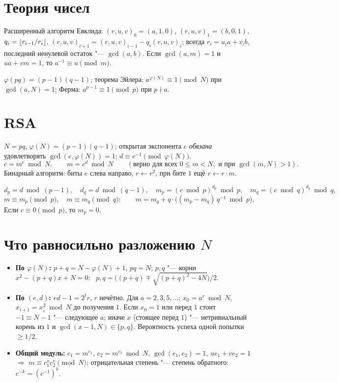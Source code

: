 \documentclass{ca-handout}
\begin{document}
\makehandouttitle

\section{Теория чисел}
Расширенный алгоритм Евклида: $(r, u, v)_0 = (a, 1, 0)$, $(r, u, v)_1 = (b, 0, 1)$,
$q_i = \lfloor r_{i-1}/r_i\rfloor$, $(r, u, v)_{i+1} = (r, u, v)_{i-1} - q_i (r, u, v)_i$; всегда
$r_i = u_i a + v_i b$, последний ненулевой остаток "--- $\gcd(a, b)$. Если $\gcd(a, m) = 1$ и
$ua + vm = 1$, то $a^{-1} \equiv u \pmod m$.

$\varphi(pq) = (p - 1)(q - 1)$; теорема Эйлера: $a^{\varphi(N)} \equiv 1 \pmod N$ при
$\gcd(a, N) = 1$; Ферма: $a^{p-1} \equiv 1 \pmod p$ при $p \nmid a$.

\section{RSA}
\begin{reminder}[title={Ключи, шифрование, расшифрование}]
$N = pq$, $\varphi(N) = (p - 1)(q - 1)$; открытая экспонента $e$ \emph{обязана}
удовлетворять $\gcd(e, \varphi(N)) = 1$; $d \equiv e^{-1} \pmod{\varphi(N)}$.
\[
  c = m^e \bmod N, \qquad m = c^d \bmod N \qquad (\text{верно для всех } 0 \le m < N,
  \text{ и при } \gcd(m, N) > 1).
\]
Бинарный алгоритм: биты $e$ слева направо, $r \gets r^2$, при бите $1$ ещё $r \gets r \cdot m$.
\end{reminder}

\begin{reminder}[title={Расшифрование по КТО}]
\[
  d_p = d \bmod (p - 1), \quad d_q = d \bmod (q - 1), \quad
  m_p = (c \bmod p)^{d_p} \bmod p, \quad m_q = (c \bmod q)^{d_q} \bmod q,
\]
\[
  m \equiv m_p \pmod p, \quad m \equiv m_q \pmod q: \qquad
  m = m_q + q \cdot \bigl((m_p - m_q)\, q^{-1} \bmod p\bigr).
\]
Если $c \equiv 0 \pmod p$, то $m_p = 0$.
\end{reminder}

\section{Что равносильно разложению $N$}
\begin{itemize}
  \item \textbf{По $\varphi(N)$:} $p + q = N - \varphi(N) + 1$, $pq = N$; $p, q$ "--- корни
    $x^2 - (p + q)x + N = 0$: \ $p, q = \bigl((p + q) \mp \sqrt{(p + q)^2 - 4N}\bigr)/2$.
  \item \textbf{По $(e, d)$:} $ed - 1 = 2^t r$, $r$ нечётно. Для $a = 2, 3, 5, \dots$:
    $x_0 = a^r \bmod N$, $x_{i+1} = x_i^2 \bmod N$ до получения $1$. Если $x_0 = 1$ или
    перед $1$ стоит $-1 \equiv N - 1$ "--- следующее $a$; иначе $x$ (стоящее перед $1$)
    "--- нетривиальный корень из $1$ и $\gcd(x - 1, N) \in \{p, q\}$. Вероятность успеха
    одной попытки $\ge 1/2$.
  \item \textbf{Общий модуль:} $c_1 = m^{e_1}$, $c_2 = m^{e_2} \bmod N$, $\gcd(e_1, e_2) = 1$,
    $u e_1 + v e_2 = 1$ $\Rightarrow$ $m \equiv c_1^u c_2^v \pmod N$; отрицательная степень "---
    степень обратного: $c^{-k} = (c^{-1})^k$.
\end{itemize}
\end{document}
